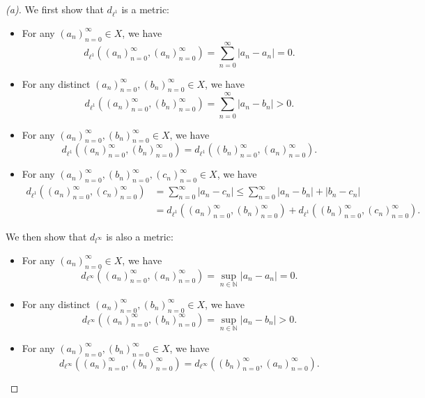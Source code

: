 \begin{proof}[(a)]
  We first show that \(d_{\ell ^1}\) is a metric: 
  \begin{itemize}
    \item For any \((a_n)_{n=0}^{\infty} \in X\), we have 
    \[d_{\ell ^1}\left( (a_n)_{n=0}^{\infty} , (a_n)_{n=0}^{\infty}  \right) = \sum_{n=0}^{\infty} \vert a_n - a_n \vert = 0.   \] 
    \item For any distinct \((a_n)_{n=0}^{\infty}, (b_n)_{n=0}^{\infty} \in X\), we have 
    \[
      d_{\ell ^1} \left( (a_n)_{n=0}^{\infty}, (b_n)_{n=0}^{\infty} \right) = \sum_{n=0}^{\infty} \left\vert a_n - b_n \right\vert > 0.   
    \]
    \item For any \((a_n)_{n=0}^{\infty}, (b_n)_{n=0}^{\infty} \in X\), we have 
    \[
      d_{\ell ^1} \left( (a_n)_{n=0}^{\infty}, (b_n)_{n=0}^{\infty} \right) = d_{\ell ^1} \left( (b_n)_{n=0}^{\infty}, (a_n)_{n=0}^{\infty} \right).  
    \]
    \item For any \((a_n)_{n=0}^{\infty}, (b_n)_{n=0}^{\infty}, (c_n)_{n=0}^{\infty} \in X\), we have 
    \begin{align*} 
      d_{\ell ^1} \left( (a_n)_{n=0}^{\infty} , (c_n)_{n=0}^{\infty}  \right) &= \sum_{n=0}^{\infty} \left\vert a_n - c_n \right\vert \le \sum_{n=0}^{\infty} \left\vert a_n - b_n \right\vert + \left\vert b_n - c_n \right\vert \\
      &= d_{\ell ^1} \left( (a_n)_{n=0}^{\infty} , (b_n)_{n=0}^{\infty}  \right) + d_{\ell ^1} \left( (b_n)_{n=0}^{\infty} , (c_n)_{n=0}^{\infty}  \right).     
    \end{align*} 
  \end{itemize} 
  We then show that \(d_{l^{\infty} }\) is also a metric: 
  \begin{itemize}
    \item For any \((a_n)_{n=0}^{\infty} \in X\), we have 
    \[
      d_{\ell ^{\infty} } \left( (a_n)_{n=0}^{\infty} , (a_n)_{n=0}^{\infty}  \right) = \sup _{n \in \mathbb{N} } \vert a_n - a_n \vert = 0. 
    \]
    \item For any distinct \((a_n)_{n=0}^{\infty}, (b_n)_{n=0}^{\infty} \in X\), we have 
    \[
      d_{\ell ^{\infty} } \left( (a_n)_{n=0}^{\infty} , (b_n)_{n=0}^{\infty}  \right) = \sup _{n \in \mathbb{N} } \vert a_n - b_n  \vert > 0.  
    \]
    \item For any \((a_n)_{n=0}^{\infty}, (b_n)_{n=0}^{\infty} \in X\), we have 
    \[
      d_{\ell ^{\infty} } \left( (a_n)_{n=0}^{\infty} , (b_n)_{n=0}^{\infty}  \right) = d_{\ell ^{\infty} } \left( (b_n)_{n=0}^{\infty} , (a_n)_{n=0}^{\infty}  \right).  
\]
\end{itemize}
\end{proof}
